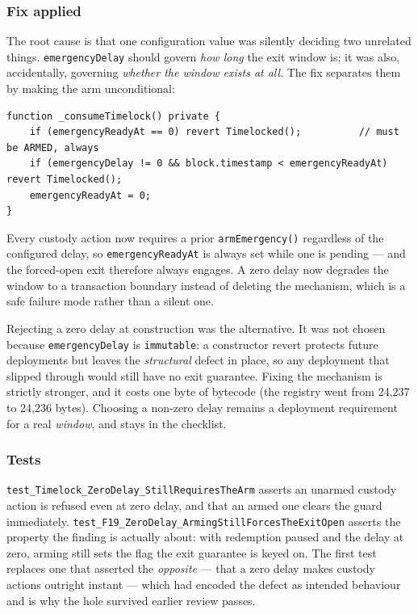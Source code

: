 \documentclass[11pt,a4paper]{article}
\newcommand{\code}[1]{\texttt{\small #1}}
\begin{document}
\subsubsection*{Fix applied}

The root cause is that one configuration value was silently deciding two unrelated
things. \code{emergencyDelay} should govern \emph{how long} the exit window is; it
was also, accidentally, governing \emph{whether the window exists at all}. The fix
separates them by making the arm unconditional:

\begin{lstlisting}
function _consumeTimelock() private {
    if (emergencyReadyAt == 0) revert Timelocked();          // must be ARMED, always
    if (emergencyDelay != 0 && block.timestamp < emergencyReadyAt) revert Timelocked();
    emergencyReadyAt = 0;
}
\end{lstlisting}

\noindent Every custody action now requires a prior \code{armEmergency()}
regardless of the configured delay, so \code{emergencyReadyAt} is always set while
one is pending --- and the forced-open exit therefore always engages. A zero delay
now degrades the window to a transaction boundary instead of deleting the
mechanism, which is a safe failure mode rather than a silent one.

Rejecting a zero delay at construction was the alternative. It was not chosen
because \code{emergencyDelay} is \code{immutable}: a constructor revert protects
future deployments but leaves the \emph{structural} defect in place, so any
deployment that slipped through would still have no exit guarantee. Fixing the
mechanism is strictly stronger, and it costs one byte of bytecode (the registry
went from 24{,}237 to 24{,}236 bytes). Choosing a non-zero delay remains a
deployment requirement for a real \emph{window}, and stays in the checklist.

\subsubsection*{Tests}

\code{test\_Timelock\_ZeroDelay\_StillRequiresTheArm} asserts an unarmed custody
action is refused even at zero delay, and that an armed one clears the guard
immediately. \code{test\_F19\_ZeroDelay\_ArmingStillForcesTheExitOpen} asserts the
property the finding is actually about: with redemption paused and the delay at
zero, arming still sets the flag the exit guarantee is keyed on. The first test
replaces one that asserted the \emph{opposite} --- that a zero delay makes custody
actions outright instant --- which had encoded the defect as intended behaviour and
is why the hole survived earlier review passes.
\end{document}
